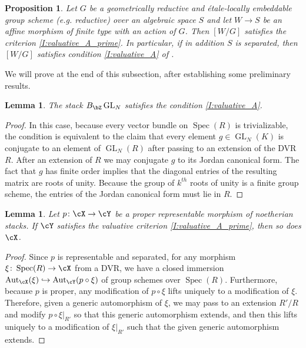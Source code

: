 \documentclass[a4paper]{amsart}
\numberwithin{equation}{section}
\theoremstyle{plain}
\newtheorem{lem}[thm]{Lemma}
\newtheorem{prop}[thm]{Proposition}
\theoremstyle{definition}
\DeclareMathOperator{\Spec}{Spec}
\DeclareMathOperator{\GL}{GL}
\DeclareMathOperator{\Aut}{Aut}
\newcommand{\co}{\colon}
\begin{document}
\begin{prop} \label{P:proper-over-affine-mod-G}
Let $G$ be a geometrically reductive and \'etale-locally embeddable group scheme (e.g. reductive) over an algebraic space $S$ and let $W \to S$ be an affine morphism of finite type with an action of $G$. Then $[W/G]$ satisfies the criterion \ref{I:valuative_A_prime}. In particular, if in addition $S$ is separated, then $[W/G]$ satisfies condition \eqref{I:valuative_A} of .
\end{prop}

We will prove  at the end of this subsection, after establishing some preliminary results.

\begin{lem} \label{L:BGL_val_criteria}
The stack $B_{\bZ}\GL_N$ satisfies the condition \eqref{I:valuative_A}.
\end{lem}
\begin{proof}
In this case, because every vector bundle on $\Spec(R)$ is trivializable, the condition is equivalent to the claim that every element $g \in \GL_N(K)$ is conjugate to an element of $\GL_N(R)$ after passing to an extension of the DVR $R$. After an extension of $R$ we may conjugate $g$ to its Jordan canonical form. The fact that $g$ has finite order implies that the diagonal entries of the resulting matrix are roots of unity. Because the group of $k^{th}$ roots of unity is a finite group scheme, the entries of the Jordan canonical form must lie in $R$.
\end{proof}

\begin{lem} \label{L:proper_val_criteria}
Let $p\co\cX \to \cY$ be a proper representable morphism of noetherian stacks. If $\cY$ satisfies the valuative criterion \ref{I:valuative_A_prime}, then so does $\cX$.
\end{lem}
\begin{proof}
Since $p$ is representable and separated, for any morphism $\xi \co \Spec(R) \to \cX$ from a DVR, we have a closed immersion $\Aut_{\cX}(\xi) \hookrightarrow \Aut_{\cY}(p \circ \xi)$ of group schemes over $\Spec(R)$. Furthermore, because $p$ is proper, any modification of $p \circ \xi$ lifts uniquely to a modification of $\xi$. Therefore, given a generic automorphism of $\xi$, we may pass to an extension $R'/R$ and modify $p \circ \xi|_{R'}$ so that this generic automorphism extends, and then this lifts uniquely to a modification of $\xi|_{R'}$ such that the given generic automorphism extends.
\end{proof}
\end{document}
